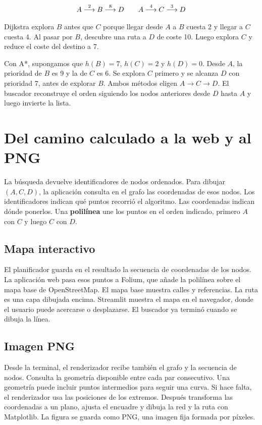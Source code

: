 \documentclass[11pt,a4paper]{article}
\begin{document}
\[
\begin{array}{c@{\qquad}c}
A \stackrel{2}{\longrightarrow} B \stackrel{8}{\longrightarrow} D &
A \stackrel{4}{\longrightarrow} C \stackrel{3}{\longrightarrow} D
\end{array}
\]

Dijkstra explora \(B\) antes que \(C\) porque llegar desde \(A\) a \(B\) cuesta 2 y llegar a \(C\) cuesta 4. Al pasar por \(B\), descubre una ruta a \(D\) de coste 10. Luego explora \(C\) y reduce el coste del destino a 7.

Con A*, supongamos que \(h(B)=7\), \(h(C)=2\) y \(h(D)=0\). Desde \(A\), la prioridad de \(B\) es 9 y la de \(C\) es 6. Se explora \(C\) primero y se alcanza \(D\) con prioridad 7, antes de explorar \(B\). Ambos métodos eligen \(A\to C\to D\). El buscador reconstruye el orden siguiendo los nodos anteriores desde \(D\) hasta \(A\) y luego invierte la lista.

\clearpage
\section{Del camino calculado a la web y al PNG}

La búsqueda devuelve identificadores de nodos ordenados. Para dibujar \((A,C,D)\), la aplicación consulta en el grafo las coordenadas de esos nodos. Los identificadores indican qué puntos recorrió el algoritmo. Las coordenadas indican dónde ponerlos. Una \textbf{polilínea} une los puntos en el orden indicado, primero \(A\) con \(C\) y luego \(C\) con \(D\).

\subsection{Mapa interactivo}

El planificador guarda en el resultado la secuencia de coordenadas de los nodos. La aplicación web pasa esos puntos a Folium, que añade la polilínea sobre el mapa base de OpenStreetMap. El mapa base muestra calles y referencias. La ruta es una capa dibujada encima. Streamlit muestra el mapa en el navegador, donde el usuario puede acercarse o desplazarse. El buscador ya terminó cuando se dibuja la línea.

\subsection{Imagen PNG}

Desde la terminal, el renderizador recibe también el grafo y la secuencia de nodos. Consulta la geometría disponible entre cada par consecutivo. Una geometría puede incluir puntos intermedios para seguir una curva. Si hace falta, el renderizador usa las posiciones de los extremos. Después transforma las coordenadas a un plano, ajusta el encuadre y dibuja la red y la ruta con Matplotlib. La figura se guarda como PNG, una imagen fija formada por píxeles.
\end{document}
